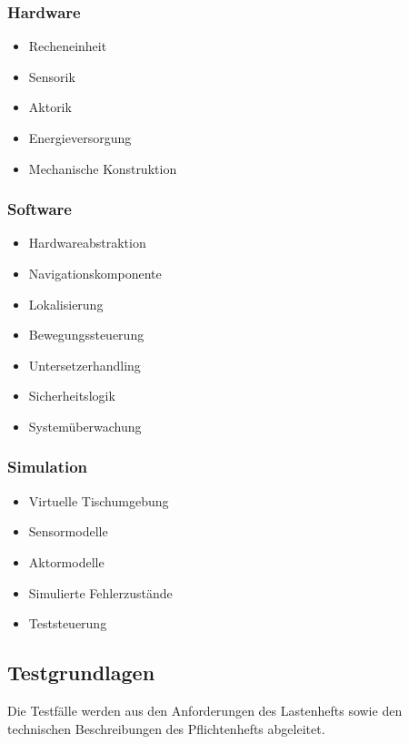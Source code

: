 \documentclass[
  a4paper,
  12pt,
  DIV=12,        %
  parskip=half,  %
  headings=small %
]{scrartcl}
\theoremstyle{definition}
\providecommand{\tightlist}{%
  \setlength{\itemsep}{0pt}\setlength{\parskip}{0pt}}
\theoremstyle{definition}
\begin{document}
\subsubsection{Hardware}\label{hardware}

\begin{itemize}
\tightlist
\item
  Recheneinheit
\item
  Sensorik
\item
  Aktorik
\item
  Energieversorgung
\item
  Mechanische Konstruktion
\end{itemize}

\subsubsection{Software}\label{software}

\begin{itemize}
\tightlist
\item
  Hardwareabstraktion
\item
  Navigationskomponente
\item
  Lokalisierung
\item
  Bewegungssteuerung
\item
  Untersetzerhandling
\item
  Sicherheitslogik
\item
  Systemüberwachung
\end{itemize}

\subsubsection{Simulation}\label{simulation}

\begin{itemize}
\tightlist
\item
  Virtuelle Tischumgebung
\item
  Sensormodelle
\item
  Aktormodelle
\item
  Simulierte Fehlerzustände
\item
  Teststeuerung
\end{itemize}

\subsection{Testgrundlagen}\label{testgrundlagen}

Die Testfälle werden aus den Anforderungen des Lastenhefts sowie den
technischen Beschreibungen des Pflichtenhefts abgeleitet.
\end{document}
